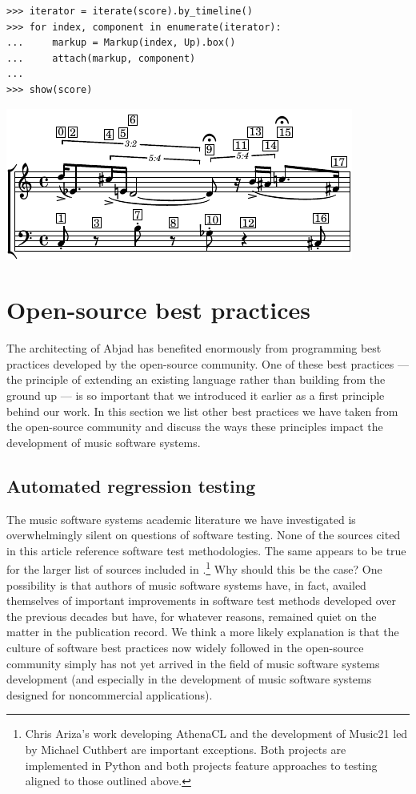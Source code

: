 \documentclass{article}
\begin{document}
\begin{lstlisting}
>>> iterator = iterate(score).by_timeline()
>>> for index, component in enumerate(iterator):
...     markup = Markup(index, Up).box()
...     attach(markup, component)
...
>>> show(score)
\end{lstlisting}
\includegraphics{assets/lilypond-3eefc169b782de95b400a81c4546bdd6.pdf}

\section{Open-source best practices} \label{sec:open-source}

The architecting of Abjad has benefited enormously from programming best
practices developed by the open-source community. One of these best practices
--- the principle of extending an existing language rather than building from
the ground up --- is so important that we introduced it earlier as a first
principle behind our work. In this section we list other best practices we have
taken from the open-source community and discuss the ways these principles
impact the development of music software systems.

\subsection{Automated regression testing}

The music software systems academic literature we have investigated is
overwhelmingly silent on questions of software testing. None of the sources
cited in this article reference software test methodologies. The same appears
to be true for the larger list of sources included in
\cite{trevino2013compositional}.\footnote{Chris Ariza's work developing
AthenaCL \cite{Ariza2005} and the development of Music21 \cite{Ariza2010} led by Michael
Cuthbert are important exceptions. Both projects are implemented in Python and
both projects feature approaches to testing aligned to those outlined above.}
Why should this be the case? One possibility is that authors of music software
systems have, in fact, availed themselves of important improvements in software
test methods developed over the previous decades but have, for whatever
reasons, remained quiet on the matter in the publication record. We think a
more likely explanation is that the culture of software best practices now
widely followed in the open-source community simply has not yet arrived in the
field of music software systems development (and especially in the development
of music software systems designed for noncommercial applications).
\end{document}
